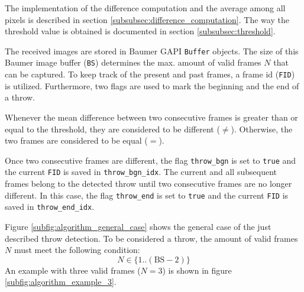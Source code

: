 The implementation of the difference computation and the average among all pixels is described in section \ref{subsubsec:difference_computation}.
The way the threshold value is obtained is documented in section \ref{subsubsec:threshold}.

The received images are stored in Baumer GAPI \texttt{Buffer} objects.
The size of this Baumer image buffer (\texttt{BS}) determines the max. amount of valid frames $N$ that can be captured.
To keep track of the present and past frames, a frame id (\texttt{FID}) is utilized.
Furthermore, two flags are used to mark the beginning and the end of a throw.

Whenever the mean difference between two consecutive frames is greater than or equal to the threshold, they are considered to be different ($\ne$).
Otherwise, the two frames are considered to be equal ($=$).

Once two consecutive frames are different, the flag \texttt{throw\_bgn} is set to \texttt{true} and the current \texttt{FID} is saved in \texttt{throw\_bgn\_idx}.
The current and all subsequent frames belong to the detected throw until two consecutive frames are no longer different.
In this case, the flag \texttt{throw\_end} is set to \texttt{true} and the current \texttt{FID} is saved in \texttt{throw\_end\_idx}.

Figure \ref{subfig:algorithm_general_case} shows the general case of the just described throw detection.
To be considered a throw, the amount of valid frames $N$ must meet the following condition:
\[
  N \in \{1..(\text{BS}-2)\}
\]
An example with three valid frames ($N = 3$) is shown in figure \ref{subfig:algorithm_example_3}.


